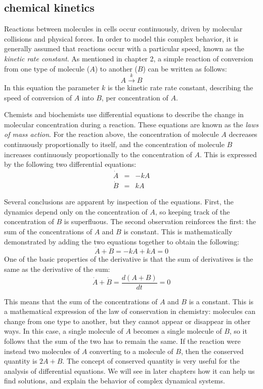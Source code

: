 \documentclass[
]{book}
\theoremstyle{definition}
\theoremstyle{definition}
\theoremstyle{definition}
\theoremstyle{remark}
\begin{document}
\hypertarget{chemical-kinetics}{%
\subsection{chemical kinetics}\label{chemical-kinetics}}

Reactions between molecules in cells occur continuously, driven by molecular collisions and physical forces. In order to model this complex behavior, it is generally assumed that reactions occur with a particular speed, known as the  \emph{kinetic rate constant}. As mentioned in chapter 2, a simple reaction of conversion from one type of molecule (\(A\)) to another (\(B\)) can be written as follows:
\[ A \xrightarrow{k} B \]
In this equation the parameter \(k\) is the kinetic rate rate constant, describing the speed of conversion of \(A\) into \(B\), per concentration of \(A\).

Chemists and biochemists use differential equations to describe the change in molecular concentration during a reaction. These equations are known as the  \emph{laws of mass action}. For the reaction above, the concentration of molecule \(A\) decreases continuously proportionally to itself, and the concentration of molecule \(B\) increases continuously proportionally to the concentration of \(A\). This is expressed by the following two differential equations:
\begin{eqnarray}
\label{eq:lin_chem_kin}
\dot A &=& - k A \\
\dot B &=& kA
\end{eqnarray}

Several conclusions are apparent by inspection of the equations. First, the dynamics depend only on the concentration of \(A\), so keeping track of the concentration of \(B\) is superfluous. The second observation reinforces the first: the sum of the concentrations of \(A\) and \(B\) is constant. This is mathematically demonstrated by adding the two equations together to obtain the following:
\[ \dot A + \dot B = -kA + kA = 0\]
One of the basic properties of the derivative is that the sum of derivatives is the same as the derivative of the sum:
\[\dot A + \dot B = \frac{d(A+B)}{dt} = 0\]

This means that the sum of the concentrations of \(A\) and \(B\) is a constant. This is a mathematical expression of the law of conservation in chemistry: molecules can change from one type to another, but they cannot appear or disappear in other ways. In this case, a single molecule of \(A\) becomes a single molecule of \(B\), so it follows that the sum of the two has to remain the same. If the reaction were instead two molecules of \(A\) converting to a molecule of \(B\), then the conserved quantity is \(2A + B\). The concept of conserved quantity is very useful for the analysis of differential equations. We will see in later chapters how it can help us find solutions, and explain the behavior of complex dynamical systems.
\end{document}
